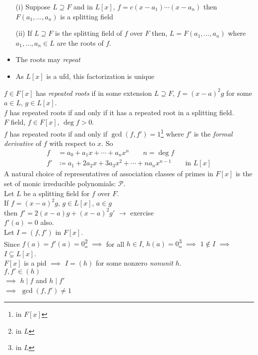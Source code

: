 \ex
\begin{enumerate}
\item[(i)] Suppose $L\supseteq F$ and in $L[x]$, $f=c(x-a_1)\dotsm(x-a_n)$ then $F(a_1,\dotsc,a_n)$ is a splitting field
\item[(ii)] If $L\supseteq F$ is the splitting field of $f$ over $F$ then, $L=F(a_1,\dotsc,a_n)$ where $a_1,\dotsc,a_n\in L$ are the roots of $f$.
\end{enumerate}
\note
\begin{itemize}
\item The roots may \emph{repeat}
\item As $L[x]$ is a ufd, this factorization is unique
\end{itemize}
 $f\in F[x]$ has \emph{repeated roots} if in some extension $L\supseteq F$, $f=(x-a)^2g$ for some $a\in L$, $g\in L[x]$. \\
\ex $f$ has repeated roots if and only if it has a repeated root in a splitting field. \\
\thm $F$ field, $f\in F[x]$, $\deg f>0$. \\
$f$ has repeated roots if and only if $\gcd(f,f')=1$\footnote{in $F[x]$} where $f'$ is the \emph{formal derivative} of $f$ with respect to $x$.  So
\begin{align*}
f &= a_0 + a_1x + \dotsb + a_nx^n \qquad n=\deg f \\
f' &\coloneqq a_1 + 2a_2x + 3a_3x^2 + \dotsb + na_nx^{n-1} \qquad \text{in $L[x]$}
\end{align*}
\remark A natural choice of representatives of association classes of primes in $F[x]$ is the set of monic irreducible polynomials: $\mathcal{P}$. \\
\pf Let $L$ be a splitting field for $f$ over $F$. \\
If $f=(x-a)^2g$, $g\in L[x]$, $a\in g$ \\
then $f'=2(x-a)g+(x-a)^2g'$ $\to$ exercise \\
$f'(a)=0$ also. \\
Let $I=(f,f')$ in $F[x]$. \\
Since $f(a)=f'(a)=0$\footnote{in $L$} $\implies$ for all $h\in I$, $h(a)=0$\footnote{in $L$} $\implies$ $1\notin I$ $\implies$ $I\subsetneq L[x]$. \\
$F[x]$ is a pid $\implies$ $I=(h)$ for some nonzero \emph{nonunit} $h$. \\
$f,f'\in(h)$ \\
$\implies$ $h\mid f$ and $h\mid f'$ \\
$\implies$ $\gcd(f,f')\neq1$ \\
